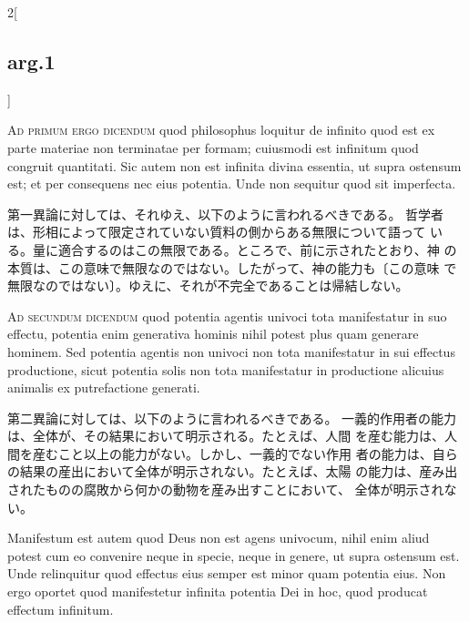 \documentclass[paper=a4paper,fontsize=10pt,jafontsize=9pt,titlepage]{jlreq}
\begin{document}
\begin{paracol}{2}[\subsection{arg.1}]
\switchcolumn*[\subsection{ad.1}]

{\scshape Ad primum ergo dicendum} quod philosophus loquitur de infinito
 quod est ex parte materiae non terminatae per formam; cuiusmodi est
 infinitum quod congruit quantitati. Sic autem non est infinita divina
 essentia, ut supra ostensum est; et per consequens nec eius
 potentia. Unde non sequitur quod sit imperfecta.

\switchcolumn

第一異論に対しては、それゆえ、以下のように言われるべきである。
哲学者は、形相によって限定されていない質料の側からある無限について語って
 いる。量に適合するのはこの無限である。ところで、前に示されたとおり、神
 の本質は、この意味で無限なのではない。したがって、神の能力も〔この意味
 で無限なのではない〕。ゆえに、それが不完全であることは帰結しない。

\switchcolumn*[\subsection{ad.2}]

{\scshape Ad secundum dicendum} quod potentia agentis univoci tota
 manifestatur in suo effectu, potentia enim generativa hominis nihil
 potest plus quam generare hominem. Sed potentia agentis non univoci non
 tota manifestatur in sui effectus productione, sicut potentia solis non
 tota manifestatur in productione alicuius animalis ex putrefactione
 generati.

\switchcolumn

第二異論に対しては、以下のように言われるべきである。
一義的作用者の能力は、全体が、その結果において明示される。たとえば、人間
 を産む能力は、人間を産むこと以上の能力がない。しかし、一義的でない作用
 者の能力は、自らの結果の産出において全体が明示されない。たとえば、太陽
 の能力は、産み出されたものの腐敗から何かの動物を産み出すことにおいて、
 全体が明示されない。

\switchcolumn*

Manifestum est autem quod Deus non est agens univocum, nihil
 enim aliud potest cum eo convenire neque in specie, neque in genere, ut
 supra ostensum est. Unde relinquitur quod effectus eius semper est
 minor quam potentia eius. Non ergo oportet quod manifestetur infinita
 potentia Dei in hoc, quod producat effectum infinitum.

\switchcolumn


\end{paracol}
\end{document}
